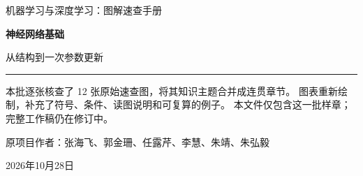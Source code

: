 \documentclass[a4paper,11pt,oneside,openany]{book}
\begin{document}
\frontmatter
\hypersetup{pageanchor=false}
\begin{titlepage}
\vspace*{16mm}
{\sffamily\color{Teal}\large 机器学习与深度学习：图解速查手册\par}
\vspace{15mm}
{\sffamily\bfseries\color{Ink}\Huge 神经网络基础\par}
\vspace{6mm}
{\sffamily\color{Ink}\LARGE 从结构到一次参数更新\par}
\vspace{12mm}
\noindent\textcolor{Teal}{\rule{\textwidth}{1.2pt}}
\vspace{7mm}
\begin{keyidea}[第一批验收样章]
本批逐张核查了 12 张原始速查图，将其知识主题合并成连贯章节。
图表重新绘制，补充了符号、条件、读图说明和可复算的例子。
本文件仅包含这一批样章；完整工作稿仍在修订中。
\end{keyidea}
\vfill
原项目作者：张海飞、郭金珊、任露芹、李慧、朱靖、朱弘毅\par
\vspace{4mm}
2026年10月28日\par
\end{titlepage}
\hypersetup{pageanchor=true}
\tableofcontents
\mainmatter

\end{document}

